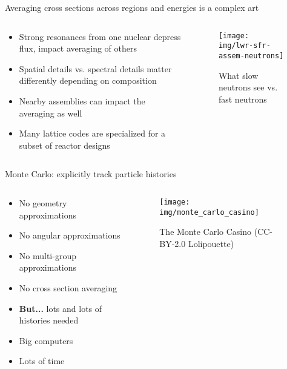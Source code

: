 \documentclass[pdf,aspectratio=169]{beamer}
\begin{document}
\begin{frame}{Averaging cross sections across regions and energies is a complex art}
\begin{columns}
    \begin{column}{0.5\textwidth}
        \begin{itemize}
            \item Strong resonances from one nuclear depress flux, impact averaging of
                others
            \item Spatial details vs. spectral details matter differently depending on
                composition
            \item Nearby assemblies can impact the averaging as well
            \item Many lattice codes are specialized for a subset of reactor designs
        \end{itemize}
    \end{column}
    \begin{column}{0.5\textwidth}
        \begin{figure}[ht]
        \centering
            \texttt{[image: img/lwr-sfr-assem-neutrons]}
        \caption{\tiny What slow neutrons see vs. fast neutrons}
        \end{figure}
    \end{column}
\end{columns}
\end{frame}


\begin{frame}{Monte Carlo: explicitly track particle histories}
\begin{columns}
    \begin{column}{0.5\textwidth}
        \begin{itemize}
            \item No geometry approximations
            \item No angular approximations
            \item No multi-group approximations
            \item No cross section averaging
            \item \textbf{But...} lots and lots of histories needed
            \item Big computers
            \item Lots of time
        \end{itemize}
    \end{column}
    \begin{column}{0.5\textwidth}
        \begin{figure}[ht]
        \centering
            \texttt{[image: img/monte\_carlo\_casino]}
            \caption{\tiny The Monte Carlo Casino (CC-BY-2.0 Lolipouette)} 
        \end{figure}
    \end{column}
\end{columns}
\end{frame}
\end{document}
